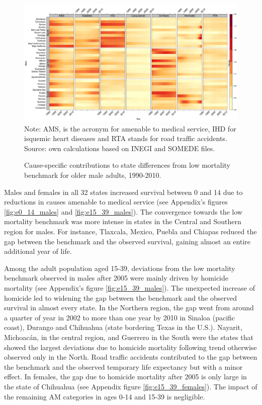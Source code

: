 \documentclass[11.5pt]{article}
\begin{document}
\begin{spacing}{1.5}
\begin{figure}[h]
\centering
\caption{Cause-specific contributions to state differences from low mortality benchmark for older male adults, 1990-2010.}
\label{fig:e40_74_males}
\includegraphics[scale=.33]{Figures/Adult_Male_heatmap.pdf}
Note: AMS, is the acronym for amenable to medical service, IHD for isquemic heart diseases and RTA stands for road traffic accidents. Source: own calculations based on INEGI and SOMEDE files. 
\end{figure}


Males and females in all 32 states increased survival between 0 and 14 due to reductions in causes amenable to medical service (see Appendix's figures  \ref{fig:e0_14_males} and \ref{fig:e15_39_males}). The convergence towards the low mortality benchmark was more intense in states in the Central and Southern region for males. For instance, Tlaxcala, Mexico, Puebla and Chiapas reduced the gap between the benchmark and the observed survival, gaining almost an entire additional year of life. 

Among the adult population aged 15-39, deviations from the low mortality benchmark observed in males after 2005 were mainly driven by homicide mortality (see Appendix's figure \ref{fig:e15_39_males}). The unexpected increase of homicide led to widening the gap between the benchmark and the observed survival in almost every state. In the Northern region, the gap went from around a quarter of year in 2002 to more than one year by 2010 in Sinaloa (pacific coast), Durango and Chihuahua (state bordering Texas in the U.S.). Nayarit, Michoac\'an, in the central region, and Guerrero in the South were the states that showed the largest deviations due to homicide mortality following trend otherwise observed only in the North. Road traffic accidents contributed to the gap between the benchmark and the observed temporary life expectancy but with a minor effect. In females, the gap due to homicide mortality after 2005 is only large in the state of Chihuahua (see Appendix figure \ref{fig:e15_39_females}). The impact of the remaining  AM categories in ages 0-14 and 15-39 is negligible. 




\end{spacing}
\end{document}
